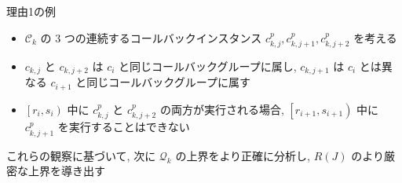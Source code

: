 \begin{frame}{理由1の例}
    \begin{itemize}
        \item $\mathcal{C}_{k}$ の 3 つの連続するコールバックインスタンス $c_{k, j}^{p}, c_{k, j+1}^{p}, c_{k, j+2}^{p}$ を考える
        \item $c_{k, j}$ と $c_{k, j+2}$ は $c_{i}$ と同じコールバックグループに属し, $c_{k, j+1}$ は $c_{i}$ とは異なる $c_{i+1}$ と同じコールバックグループに属す
        \item $\left[r_{i}, s_{i}\right)$ 中に $c_{k, j}^{p}$ と $c_{k, j+2}^{p}$ の両方が実行される場合, $\left[r_{i+1}, s_{i+1}\right)$ 中に $c_{k, j+1}^{p}$ を実行することはできない
    \end{itemize}
\end{frame}

\begin{frame}{}
    これらの観察に基づいて, 次に $\mathcal{Q}_{k}$ の上界をより正確に分析し, $R(J)$ のより厳密な上界を導き出す
\end{frame}
